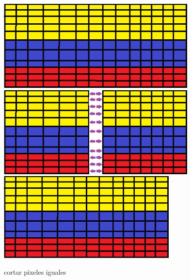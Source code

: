 \documentclass{article}
\begin{document}
\begin{figure}[h]
\includegraphics[width=10cm]{bandera_pixel.png}
\includegraphics[width=10cm]{eliminar_pixel.png}
\includegraphics[width=9cm]{acomodar.png}
\centering
\caption{cortar pixeles iguales}
\label{fig:matriz de leds}
\end{figure}



\end{document}
